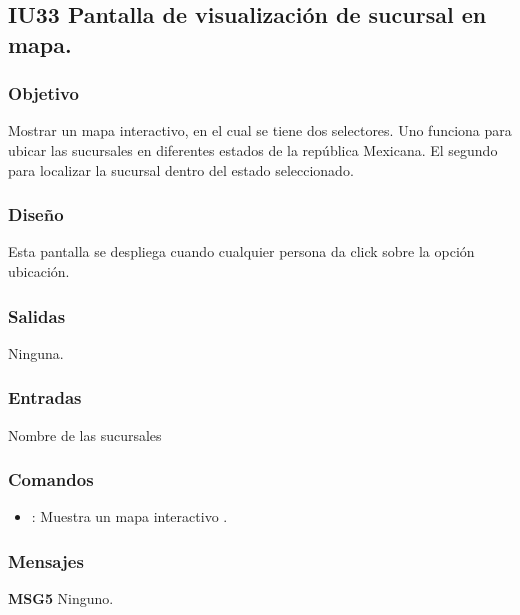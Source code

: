 
\subsection{IU33 Pantalla de visualización de sucursal en mapa.}

\subsubsection{Objetivo}
	Mostrar un mapa interactivo, en el cual se tiene dos selectores. Uno funciona para ubicar las sucursales en diferentes estados de la república Mexicana. El segundo para localizar la sucursal dentro del estado seleccionado.

\subsubsection{Diseño}
	Esta pantalla se despliega cuando cualquier persona da click sobre la opción ubicación.


\subsubsection{Salidas}

	Ninguna.

\subsubsection{Entradas}
Nombre de las sucursales

\subsubsection{Comandos}
\begin{itemize}
	\item {}: Muestra un mapa interactivo .
\end{itemize}

\subsubsection{Mensajes}
	\begin{Citemize}
		\item {\bf MSG5} Ninguno.
	\end{Citemize}
	
